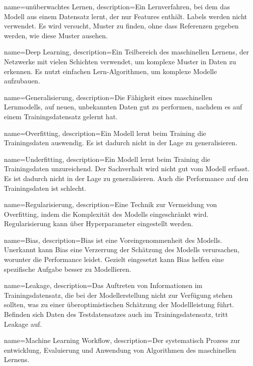 {
        name=unüberwachtes Lernen,
        description={Ein Lernverfahren,  bei dem das Modell aus einem Datensatz lernt, der nur Features enthält. Labels werden nicht verwendet. Es wird versucht, Muster zu finden, ohne dass Referenzen gegeben werden, wie diese Muster ausehen.}
}

{
        name=Deep Learning,
        description={Ein Teilbereich des maschinellen Lernens, der Netzwerke mit vielen Schichten verwendet, um komplexe Muster in Daten zu erkennen. Es nutzt einfachen Lern-Algorithmen, um komplexe Modelle aufzubauen.}
}

{
        name=Generalisierung,
        description={Die Fähigkeit eines maschinellen Lernmodells, auf neuen, unbekannten Daten gut zu performen, nachdem es auf einem Trainingsdatensatz gelernt hat.}
}

{
        name=Overfitting,
        description={Ein Modell lernt beim Training die Trainingsdaten auswendig. Es ist dadurch nicht in der Lage zu generalisieren.}
}

{
        name=Underfitting,
        description={Ein Modell lernt beim Training die Trainingsdaten unzureichend. Der Sachverhalt wird nicht gut vom Modell erfasst. Es ist dadurch nicht in der Lage zu generalisieren. Auch die Performance auf den Trainingsdaten ist schlecht.}
}

{
        name=Regularisierung,
        description={Eine Technik zur Vermeidung von Overfitting, indem die Komplexität des Modells eingeschränkt wird. Regularisierung kann über Hyperparameter eingestellt werden.}
}

{
        name=Bias,
        description={Bias ist eine Voreingenommenheit des Modells. Unerkannt kann Bias eine Verzerrung der Schätzung des Modells verursachen, worunter die Performance leidet. Gezielt eingesetzt kann Bias helfen eine spezifische Aufgabe besser zu Modellieren.}
}

{
        name=Leakage,
        description={Das Auftreten von Informationen im Trainingsdatensatz, die bei der Modellerstellung nicht zur Verfügung stehen sollten, was zu einer überoptimistischen Schätzung der Modellleistung führt. Befinden sich Daten des Testdatensatzes auch im Trainingsdatensatz, tritt Leakage auf.}
}

{
        name=Machine Learning Workflow,
        description={Der systematisch Prozess zur entwicklung, Evaluierung und Anwendung von Algorithmen des maschinellen Lernens.}
}

